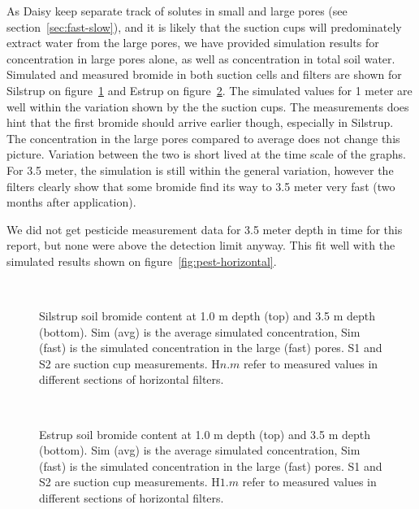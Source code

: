 As Daisy keep separate track of solutes in small and large pores (see
section~\ref{sec:fast-slow}), and it is likely that the suction cups
will predominately extract water from the large pores, we have
provided simulation results for concentration in large pores alone, as
well as concentration in total soil water.  Simulated and measured
bromide in both suction cells and filters are shown for Silstrup on
figure~\ref{fig:Silstrup-bromide} and Estrup on
figure~\ref{fig:Estrup-bromide}.  The simulated values for 1 meter are
well within the variation shown by the the suction cups.  The
measurements does hint that the first bromide should arrive earlier
though, especially in Silstrup.  The concentration in the large pores
compared to average does not change this picture.  Variation between
the two is short lived at the time scale of the graphs.  For 3.5
meter, the simulation is still within the general variation, however
the filters clearly show that some bromide find its way to 3.5 meter
very fast (two months after application).

We did not get pesticide measurement data for 3.5 meter depth in time
for this report, but none were above the detection limit anyway.  This
fit well with the simulated results shown on
figure~\ref{fig:pest-horizontal}.

\begin{figure}[htbp]
  \begin{center}
    \\
  \end{center}
  \caption{Silstrup soil bromide content at 1.0 m depth (top) and 3.5
    m depth (bottom).  Sim (avg) is the average simulated
    concentration, Sim (fast) is the simulated concentration in the
    large (fast) pores.  S1 and S2 are suction cup measurements.
    H$n$.$m$ refer to measured values in different sections of
    horizontal filters.}
  \label{fig:Silstrup-bromide}
\end{figure}

\begin{figure}[htbp]
  \begin{center}
    \\
  \end{center}
  \caption{Estrup soil bromide content at 1.0 m depth (top) and 3.5
    m depth (bottom).  Sim (avg) is the average simulated
    concentration, Sim (fast) is the simulated concentration in the
    large (fast) pores.  S1 and S2 are suction cup measurements.
    H$1$.$m$ refer to measured values in different sections of
    horizontal filters.}
  \label{fig:Estrup-bromide}
\end{figure}

